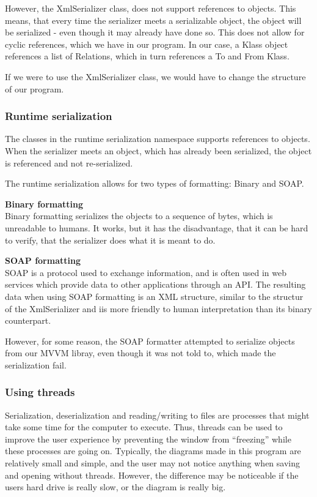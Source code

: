 However, the XmlSerializer class, does not support references to objects. This
means, that every time the serializer meets a serializable object, the object
will be serialized - even though it may already have done so. This does not
allow for cyclic references, which we have in our program. In our case, a Klass
object references a list of Relations, which in turn references a To and From
Klass.

If we were to use the XmlSerializer class, we would have to change the structure
of our program.

\subsubsection{Runtime serialization} 

The classes in the runtime serialization
namespace supports references to objects. When the serializer meets an object,
which has already been serialized, the object is referenced and not
re-serialized.


The runtime serialization allows for two types of formatting: Binary and SOAP.

\textbf{Binary formatting}\\ Binary formatting serializes the objects to a
sequence of bytes, which is unreadable to humans. It works, but it has the
disadvantage, that it can be hard to verify, that the serializer does what it is
meant to do.

\textbf{SOAP formatting}\\ SOAP is a protocol used to exchange information, and
is often used in web services which provide data to other applications through
an API. The resulting data when using SOAP formatting is an XML structure,
similar to the structur of the XmlSerializer and iis more friendly to human
interpretation than its binary counterpart.

However, for some reason, the SOAP formatter attempted to serialize objects from
our MVVM libray, even though it was not told to, which made the serialization
fail.

\subsubsection{Using threads} 

Serialization, deserialization and reading/writing
to files are processes that might take some time for the computer to execute.
Thus, threads can be used to improve the user experience by preventing the
window from “freezing” while these processes are going on. Typically, the
diagrams made in this program are relatively small and simple, and the user may
not notice anything when saving and opening without threads. However, the
difference may be noticeable if the users hard drive is really slow, or the
diagram is really big.

